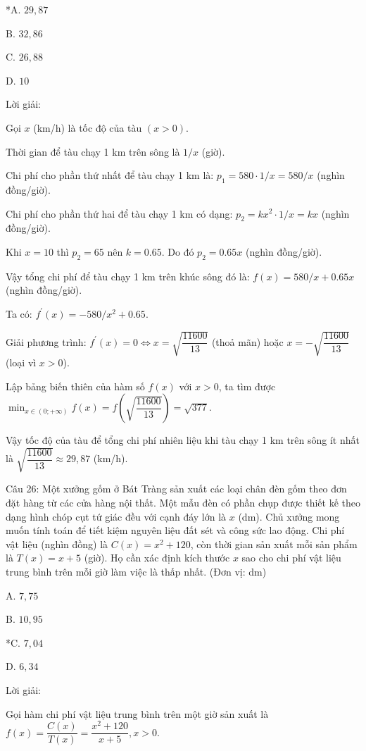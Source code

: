 \documentclass[a4paper,12pt]{article}
\begin{document}
*A. \(29,87\)

B. \(32,86\)

C. \(26,88\)

D. \(10\)

Lời giải:


Gọi \(x\) (km/h) là tốc độ của tàu \((x > 0)\).

Thời gian để tàu chạy 1 km trên sông là \(1/x\) (giờ).

Chi phí cho phần thứ nhất để tàu chạy 1 km là: \(p_1=580 \cdot 1/x=580/x\) (nghìn đồng/giờ).

Chi phí cho phần thứ hai để tàu chạy 1 km có dạng: \(p_2=k x^2 \cdot 1/x=k x\) (nghìn đồng/giờ).

Khi \(x=10\) thì \(p_2=65\) nên \(k=0.65\). Do đó \(p_2=0.65 x\) (nghìn đồng/giờ).

Vậy tổng chi phí để tàu chạy 1 km trên khúc sông đó là: \(f(x)=580/x+0.65 x\) (nghìn đồng/giờ).

Ta có: \(f^{\prime}(x)=-580/x^2+0.65\).

        Giải phương trình: \(f^{\prime}(x)=0 \Leftrightarrow x=\sqrt{\dfrac{11600}{13}}\) (thoả mãn) hoặc \(x=-\sqrt{\dfrac{11600}{13}}\) (loại vì \(x>0\)).

        Lập bảng biến thiên của hàm số \(f(x)\) với \(x>0\), ta tìm được \(\min_{x \in(0 ;+\infty)} f(x)=f(\sqrt{\dfrac{11600}{13}})=\sqrt{377}\).

        Vậy tốc độ của tàu để tổng chi phí nhiên liệu khi tàu chạy 1 km trên sông ít nhất là \(\sqrt{\dfrac{11600}{13}} \approx 29,87\) (km/h).




Câu 26: Một xưởng gốm ở Bát Tràng sản xuất các loại chân đèn gốm theo đơn đặt hàng từ các cửa hàng nội thất. Một mẫu đèn có phần chụp được thiết kế theo dạng hình chóp cụt tứ giác đều với cạnh đáy lớn là \(x\) (dm). Chủ xưởng mong muốn tính toán để tiết kiệm nguyên liệu đất sét và công sức lao động. Chi phí vật liệu (nghìn đồng) là \(C(x) = x^2 + 120\), còn thời gian sản xuất mỗi sản phẩm là \(T(x) = x + 5\) (giờ). Họ cần xác định kích thước \(x\) sao cho chi phí vật liệu trung bình trên mỗi giờ làm việc là thấp nhất. (Đơn vị: dm)

A. \(7,75\)

B. \(10,95\)

*C. \(7,04\)

D. \(6,34\)

Lời giải:


Gọi hàm chi phí vật liệu trung bình trên một giờ sản xuất là \(f(x)=\dfrac{C(x)}{T(x)}=\dfrac{x^2+120}{x+5}, x>0\).
\end{document}
